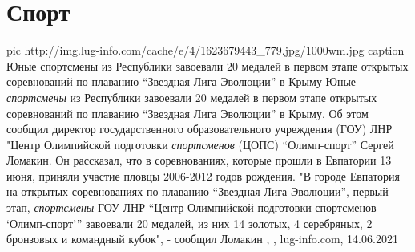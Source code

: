  
 
 
 
 
\chapter{Спорт}
\label{sec:slova.sport}

\ifcmt
  pic http://img.lug-info.com/cache/e/4/1623679443_779.jpg/1000wm.jpg
	caption Юные спортсмены из Республики завоевали 20 медалей в первом этапе открытых соревнований по плаванию \enquote{Звездная Лига Эволюции} в Крыму
\fi
Юные \emph{спортсмены} из Республики завоевали 20 медалей в первом этапе открытых
соревнований по плаванию \enquote{Звездная Лига Эволюции} в Крыму. Об этом сообщил
директор государственного образовательного учреждения (ГОУ) ЛНР "Центр
Олимпийской подготовки \emph{спортсменов} (ЦОПС) \enquote{Олимп-спорт} Сергей Ломакин.
Он рассказал, что в соревнованиях, которые прошли в Евпатории 13 июня, приняли
участие пловцы 2006-2012 годов рождения.
"В городе Евпатория на открытых соревнованиях по плаванию 
\enquote{Звездная Лига
Эволюции}, первый этап, \emph{спортсмены} ГОУ ЛНР \enquote{Центр Олимпийской подготовки
спортсменов \enquote{Олимп-спорт}} завоевали 20 медалей, из них 14 золотых, 4
серебряных, 2 бронзовых и командный кубок", - сообщил Ломакин
, 
, lug-info.com, 14.06.2021

